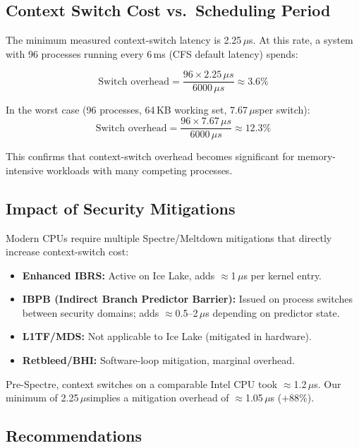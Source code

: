 \documentclass[12pt,a4paper]{article}
\newcommand{\us}{$\mu$s}
\begin{document}
\subsection{Context Switch Cost vs.\ Scheduling Period}

The minimum measured context-switch latency is 2.25\,\us. At this rate, a
system with 96 processes running every 6\,ms (CFS default latency) spends:

\[
    \text{Switch overhead} = \frac{96 \times 2.25\,\mu s}{6000\,\mu s} \approx 3.6\%
\]

In the worst case (96 processes, 64\,KB working set, 7.67\,\us per switch):
\[
    \text{Switch overhead} = \frac{96 \times 7.67\,\mu s}{6000\,\mu s} \approx 12.3\%
\]

This confirms that context-switch overhead becomes significant for
memory-intensive workloads with many competing processes.

\subsection{Impact of Security Mitigations}

Modern CPUs require multiple Spectre/Meltdown mitigations that directly
increase context-switch cost:

\begin{itemize}
    \item \textbf{Enhanced IBRS:} Active on Ice Lake, adds $\approx$1\,\us
    per kernel entry.
    \item \textbf{IBPB (Indirect Branch Predictor Barrier):} Issued on
    process switches between security domains; adds $\approx$0.5–2\,\us
    depending on predictor state.
    \item \textbf{L1TF/MDS:} Not applicable to Ice Lake (mitigated in hardware).
    \item \textbf{Retbleed/BHI:} Software-loop mitigation, marginal overhead.
\end{itemize}

Pre-Spectre, context switches on a comparable Intel CPU took $\approx$1.2\,\us.
Our minimum of 2.25\,\us implies a mitigation overhead of $\approx$1.05\,\us
($+88\%$).

\subsection{Recommendations}
\end{document}
